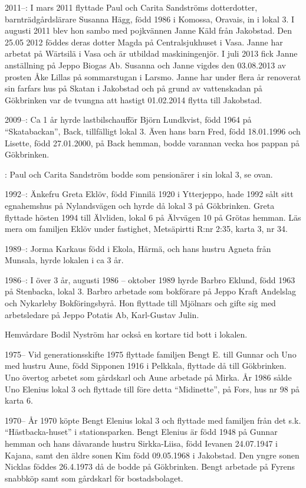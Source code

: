 2011--: I mars 2011 flyttade Paul och Carita Sandströms dotterdotter, barnträdgårdslärare Susanna Hägg, född 1986 i Komossa, Oravais, in i lokal 3. I augusti 2011 blev hon sambo med pojkvännen Janne Käld från Jakobstad. Den 25.05 2012 föddes deras dotter Magda på Centralsjukhuset i Vasa. Janne har arbetat på Wärtsilä i Vasa och är utbildad maskiningenjör. I juli 2013 fick Janne anställning på Jeppo Biogas Ab. Susanna och Janne vigdes den 03.08.2013 av prosten Åke Lillas på sommarstugan i Larsmo. Janne har under flera år renoverat sin farfars hus på Skatan i Jakobstad och på grund av vattenskadan på Gökbrinken var de tvungna att hastigt 01.02.2014 flytta till Jakobstad.

2009--:	Ca 1 år hyrde lastbilschaufför Björn Lundkvist, född 1964 på ``Skatabackan'', Back, tillfälligt lokal 3. Även hans barn Fred, född 18.01.1996 och Lisette, född 27.01.2000, på Back hemman, bodde varannan vecka hos pappan på Gökbrinken.

:	Paul och Carita Sandström bodde som pensionärer i sin lokal 3, se ovan.

1992--: Änkefru Greta Eklöv, född Finnilä 1920 i Ytterjeppo, hade 1992 sålt sitt egnahemshus på Nylandsvägen och hyrde då lokal 3 på Gökbrinken. Greta flyttade hösten 1994 till Älvliden, lokal 6 på Älvvägen 10 på Grötas hemman. Läs mera om familjen Eklöv under fastighet, Metsäpirtti R:nr 2:35, karta 3, nr 34.

1989--: Jorma Karkaus född i Ekola, Härmä, och hans hustru Agneta från Munsala, hyrde lokalen i ca 3 år.

1986--: I över 3 år, augusti 1986 – oktober 1989 hyrde Barbro Eklund, född 1963 på Stenbacka, lokal 3. Barbro arbetade som bokförare på Jeppo Kraft Andelslag och Nykarleby Bokföringsbyrå. Hon flyttade till Mjölnars och gifte sig med arbetsledare på Jeppo Potatis Ab, Karl-Gustav Julin.

Hemvårdare Bodil Nyström har också en kortare tid bott i lokalen.

 1975--
Vid generationsskifte 1975 flyttade familjen Bengt E. till Gunnar och Uno med hustru Aune, född Sipponen 1916 i Pelkkala, flyttade då till Gökbrinken. Uno övertog arbetet som gårdskarl och Aune arbetade på Mirka. År 1986 sålde Uno Elenius lokal 3 och flyttade till före detta ``Midinette'', på Fors, hus nr 98 på karta 6.

 1970--
År 1970 köpte Bengt Elenius lokal 3 och flyttade med familjen från det s.k. ``Hästbacka-huset'' i stationsparken.  Bengt Elenius är född 1948 på Gunnar hemman och hans dåvarande hustru Sirkka-Liisa, född Ievanen 24.07.1947 i Kajana, samt den äldre sonen Kim född 09.05.1968 i Jakobstad. Den yngre sonen Nicklas föddes 26.4.1973 då de bodde på Gökbrinken. Bengt arbetade på Fyrens snabbköp samt som gårdskarl för bostadsbolaget.


